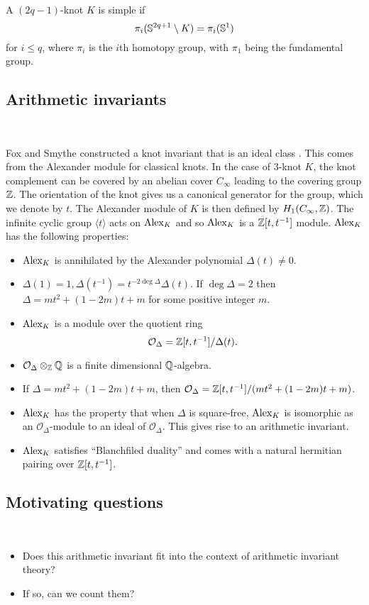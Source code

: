 \documentclass[12pt,amsfont]{amsart}
\begin{document}
\begin{dfn} A $(2q-1)$-knot $K$ is simple if 
\[ \pi_i({\mathbb S}^{2q+1} \setminus K) = \pi_i({\mathbb S}^1) \]
for $i \leq q$, where $\pi_i$ is the $i$th homotopy group, with $\pi_1$ being the fundamental group.
\end{dfn}

\subsection{Arithmetic invariants}
{\ }

Fox and Smythe constructed a knot invariant that is an ideal class . This comes from the Alexander module for classical knots. In the case of $3$-knot $K$, the knot complement can be covered by an abelian cover $C_\infty$ leading to the covering group ${\mathbb Z}$. The orientation of the knot gives us a canonical generator for the group, which we denote by $t$. The Alexander module of $K$ is then defined by $H_1(C_\infty, {\mathbb Z})$. The infinite cyclic group $\langle t \rangle$ acts on $\operatorname{Alex}_K$ and so $\operatorname{Alex}_K$ is a ${\mathbb Z}[t, t^{-1}]$ module. $\operatorname{Alex}_K$ has the following properties:
{\ }
\begin{itemize}
\item
$\operatorname{Alex}_K$ is annihilated by the Alexander polynomial $\Delta(t) \ne 0$. 
\item
$\Delta(1) = 1, \Delta(t^{-1}) = t^{- 2\deg \Delta} \Delta(t)$. If $\deg \Delta = 2$ then $\Delta = mt^2 + (1-2m)t + m$ for some positive integer $m$.  
\item
$\operatorname{Alex}_K$ is a module over the quotient ring 
\[\mathcal{O}_\Delta = {\mathbb Z}[t, t^{-1}]/\Delta(t). \]
\item
$\mathcal{O}_\Delta \otimes_{\mathbb Z} {\mathbb Q}$ is a finite dimensional ${\mathbb Q}$-algebra. 
\item
If $\Delta = mt^2 + (1-2m)t + m$, then $\mathcal{O}_\Delta = {\mathbb Z}[t, t^{-1}]/(mt^2 + (1-2m)t + m)$. 
\item
$\operatorname{Alex}_K$ has the property that when $\Delta$ is square-free, $\operatorname{Alex}_K$ is isomorphic as an $\mathcal{O}_\Delta$-module to an ideal of $\mathcal{O}_\Delta$. This gives rise to an arithmetic invariant.
\item
$\operatorname{Alex}_K$ satisfies ``Blanchfiled duality'' and comes with a natural hermitian pairing over ${\mathbb Z}[t, t^{-1}]$. 
\end{itemize}

\subsection{Motivating questions}
{\ }
\begin{itemize}
\item
Does this arithmetic invariant fit into the context of arithmetic invariant theory?
\item
If so, can we count them?
\end{itemize}
\end{document}
